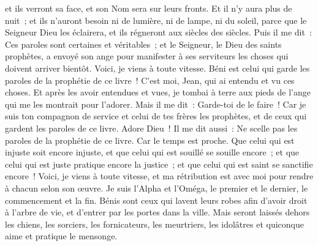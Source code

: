 \begin{multicols}{2}
et ils verront sa face, et son Nom sera sur leurs fronts.
Et il n'y aura plus de nuit~; et ils n'auront besoin ni de lumière, ni de lampe, ni du soleil, parce que le Seigneur Dieu les éclairera, et ils régneront aux siècles des siècles.
Puis il me dit~: Ces paroles sont certaines et véritables~; et le Seigneur, le Dieu des saints prophètes, a envoyé son ange pour manifester à ses serviteurs les choses qui doivent arriver bientôt.
Voici, je viens à toute vitesse. Béni est celui qui garde les paroles de la prophétie de ce livre~!
C'est moi, Jean, qui ai entendu et vu ces choses. Et après les avoir entendues et vues, je tombai à terre aux pieds de l'ange qui me les montrait pour l'adorer.
Mais il me dit~: Garde-toi de le faire~! Car je suis ton compagnon de service et celui de tes frères les prophètes, et de ceux qui gardent les paroles de ce livre. Adore Dieu~!
Il me dit aussi~: Ne scelle pas les paroles de la prophétie de ce livre. Car le temps est proche.
Que celui qui est injuste soit encore injuste, et que celui qui est souillé se souille encore~; et que celui qui est juste pratique encore la justice~; et que celui qui est saint se sanctifie encore~!
Voici, je viens à toute vitesse, et ma rétribution est avec moi pour rendre à chacun selon son œuvre.
Je suis l'Alpha et l'Oméga, le premier et le dernier, le commencement et la fin.
Bénis sont ceux qui lavent leurs robes afin d'avoir droit à l'arbre de vie, et d'entrer par les portes dans la ville.
Mais seront laissés dehors les chiens, les sorciers, les fornicateurs, les meurtriers, les idolâtres et quiconque aime et pratique le mensonge.

\end{multicols}

